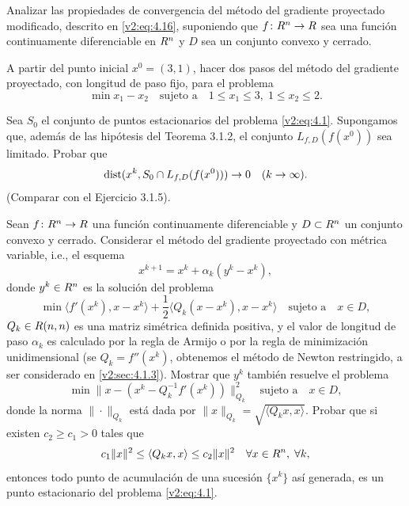 \begin{exercise}\label{v2:ejer:4.1.3}
    Analizar las propiedades de convergencia del método del gradiente proyectado modificado, descrito en \eqref{v2:eq:4.16}, suponiendo que $f \colon R^n \to R$ sea una función continuamente diferenciable en $R^n$ y $D$ sea un conjunto convexo y cerrado.
\end{exercise}

\begin{exercise}\label{v2:ejer:4.1.4}
    A partir del punto inicial $x^0 = (3, 1)$, hacer dos pasos del método del gradiente proyectado, con longitud de paso fijo, para el problema
    \[
        \min x_1 - x_2 \quad \text{sujeto a} \quad 1 \le x_1 \le 3, \; 1 \le x_2 \le 2.
    \]
\end{exercise}

\begin{exercise}\label{v2:ejer:4.1.5}
    Sea $S_0$ el conjunto de puntos estacionarios del problema \eqref{v2:eq:4.1}. Supongamos que, además de las hipótesis del Teorema 3.1.2, el conjunto $L_{f, D}(f(x^0))$ sea limitado. Probar que
    \[
        \operatorname{dist}(x^k, S_0 \cap L_{f, D}(f(x^0))) \to 0 \quad (k \to \infty).
    \]
    (Comparar con el Ejercicio 3.1.5).
\end{exercise}

\begin{exercise}\label{v2:ejer:4.1.6}
    Sean $f \colon R^n \to R$ una función continuamente diferenciable y $D \subset R^n$ un conjunto convexo y cerrado. Considerar el método del gradiente proyectado con métrica variable, i.e., el esquema
    \[
        x^{k+1} = x^k + \alpha_k (y^k - x^k),
    \]
    donde $y^k \in R^n$ es la solución del problema
    \[
        \min \langle f'(x^k), x - x^k \rangle + \frac{1}{2}\langle Q_k(x - x^k), x - x^k \rangle \quad \text{sujeto a} \quad x \in D,
    \]
    $Q_k \in R(n, n)$ es una matriz simétrica definida positiva, y el valor de longitud de paso $\alpha_k$ es calculado por la regla de Armijo o por la regla de minimización unidimensional (se $Q_k = f''(x^k)$, obtenemos el método de Newton restringido, a ser considerado en \cref{v2:sec:4.1.3}). Mostrar que $y^k$ también resuelve el problema
    \[
        \min \|x - (x^k - Q_k^{-1} f'(x^k))\|_{Q_k}^2 \quad \text{sujeto a} \quad x \in D,
    \]
    donde la norma $\|\cdot\|_{Q_k}$ está dada por $\|x\|_{Q_k} = \sqrt{\langle Q_k x, x \rangle}$. Probar que si existen $c_2 \ge c_1 > 0$ tales que
    \[
        c_1\|x\|^2 \le \langle Q_k x, x \rangle \le c_2\|x\|^2 \quad \forall x \in R^n, \; \forall k,
    \]
    entonces todo punto de acumulación de una sucesión $\{x^k\}$ así generada, es un punto estacionario del problema \eqref{v2:eq:4.1}.
\end{exercise}

